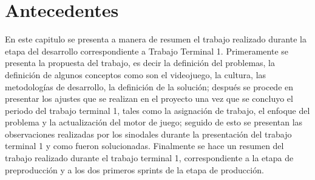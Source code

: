 \chapter{Antecedentes}
En este capitulo se presenta a manera de resumen el trabajo realizado durante 
la etapa del desarrollo correspondiente a Trabajo Terminal 1. Primeramente se 
presenta la propuesta del trabajo, es decir la definición del problemas, la 
definición de algunos conceptos como son el videojuego, la cultura, las 
metodologías de desarrollo, la definición de la solución; después se procede en 
presentar los ajustes que se realizan en el proyecto una vez que se concluyo el 
periodo del trabajo terminal 1, tales como la asignación de trabajo, el enfoque 
del problema y la actualización del motor de juego; seguido de esto se presentan 
las observaciones realizadas por los sinodales durante la presentación del trabajo 
terminal 1 y como fueron solucionadas. Finalmente se hace un resumen del trabajo 
realizado durante el trabajo terminal 1, correspondiente a la etapa de 
preproducción y a los dos primeros sprints de la etapa de producción.   





